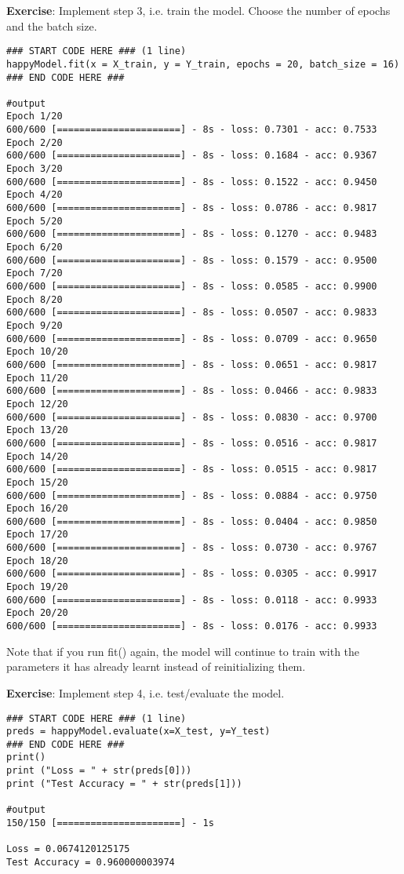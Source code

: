 {\textbf {Exercise}}: Implement step 3, i.e. train the model. Choose the number of epochs and the batch size.
\begin{verbatim}
### START CODE HERE ### (1 line)
happyModel.fit(x = X_train, y = Y_train, epochs = 20, batch_size = 16)
### END CODE HERE ###

#output
Epoch 1/20
600/600 [======================] - 8s - loss: 0.7301 - acc: 0.7533     
Epoch 2/20
600/600 [======================] - 8s - loss: 0.1684 - acc: 0.9367     
Epoch 3/20
600/600 [======================] - 8s - loss: 0.1522 - acc: 0.9450     
Epoch 4/20
600/600 [======================] - 8s - loss: 0.0786 - acc: 0.9817     
Epoch 5/20
600/600 [======================] - 8s - loss: 0.1270 - acc: 0.9483     
Epoch 6/20
600/600 [======================] - 8s - loss: 0.1579 - acc: 0.9500     
Epoch 7/20
600/600 [======================] - 8s - loss: 0.0585 - acc: 0.9900     
Epoch 8/20
600/600 [======================] - 8s - loss: 0.0507 - acc: 0.9833     
Epoch 9/20
600/600 [======================] - 8s - loss: 0.0709 - acc: 0.9650     
Epoch 10/20
600/600 [======================] - 8s - loss: 0.0651 - acc: 0.9817     
Epoch 11/20
600/600 [======================] - 8s - loss: 0.0466 - acc: 0.9833     
Epoch 12/20
600/600 [======================] - 8s - loss: 0.0830 - acc: 0.9700     
Epoch 13/20
600/600 [======================] - 8s - loss: 0.0516 - acc: 0.9817     
Epoch 14/20
600/600 [======================] - 8s - loss: 0.0515 - acc: 0.9817     
Epoch 15/20
600/600 [======================] - 8s - loss: 0.0884 - acc: 0.9750     
Epoch 16/20
600/600 [======================] - 8s - loss: 0.0404 - acc: 0.9850     
Epoch 17/20
600/600 [======================] - 8s - loss: 0.0730 - acc: 0.9767     
Epoch 18/20
600/600 [======================] - 8s - loss: 0.0305 - acc: 0.9917     
Epoch 19/20
600/600 [======================] - 8s - loss: 0.0118 - acc: 0.9933     
Epoch 20/20
600/600 [======================] - 8s - loss: 0.0176 - acc: 0.9933     
\end{verbatim}

Note that if you run fit() again, the model will continue to train with the parameters it has already learnt instead of reinitializing them.

{\textbf {Exercise}}:  Implement step 4, i.e. test/evaluate the model.


\begin{verbatim}
### START CODE HERE ### (1 line)
preds = happyModel.evaluate(x=X_test, y=Y_test)
### END CODE HERE ###
print()
print ("Loss = " + str(preds[0]))
print ("Test Accuracy = " + str(preds[1]))

#output
150/150 [======================] - 1s     

Loss = 0.0674120125175
Test Accuracy = 0.960000003974
\end{verbatim}



